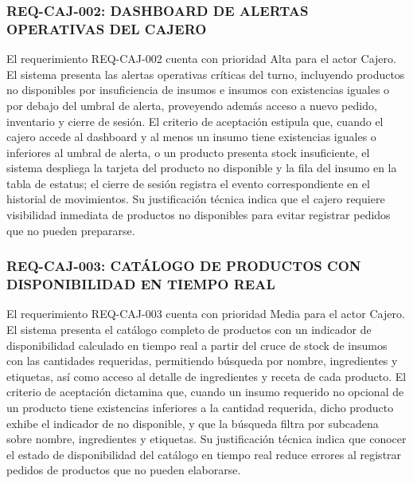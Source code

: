\subsubsection{REQ-CAJ-002: DASHBOARD DE ALERTAS OPERATIVAS DEL CAJERO}
El requerimiento REQ-CAJ-002 cuenta con prioridad Alta para el actor Cajero. El sistema presenta las alertas operativas críticas del turno, incluyendo productos no disponibles por insuficiencia de insumos e insumos con existencias iguales o por debajo del umbral de alerta, proveyendo además acceso a nuevo pedido, inventario y cierre de sesión. El criterio de aceptación estipula que, cuando el cajero accede al dashboard y al menos un insumo tiene existencias iguales o inferiores al umbral de alerta, o un producto presenta stock insuficiente, el sistema despliega la tarjeta del producto no disponible y la fila del insumo en la tabla de estatus; el cierre de sesión registra el evento correspondiente en el historial de movimientos. Su justificación técnica indica que el cajero requiere visibilidad inmediata de productos no disponibles para evitar registrar pedidos que no pueden prepararse.

\subsubsection{REQ-CAJ-003: CATÁLOGO DE PRODUCTOS CON DISPONIBILIDAD EN TIEMPO REAL}
El requerimiento REQ-CAJ-003 cuenta con prioridad Media para el actor Cajero. El sistema presenta el catálogo completo de productos con un indicador de disponibilidad calculado en tiempo real a partir del cruce de stock de insumos con las cantidades requeridas, permitiendo búsqueda por nombre, ingredientes y etiquetas, así como acceso al detalle de ingredientes y receta de cada producto. El criterio de aceptación dictamina que, cuando un insumo requerido no opcional de un producto tiene existencias inferiores a la cantidad requerida, dicho producto exhibe el indicador de no disponible, y que la búsqueda filtra por subcadena sobre nombre, ingredientes y etiquetas. Su justificación técnica indica que conocer el estado de disponibilidad del catálogo en tiempo real reduce errores al registrar pedidos de productos que no pueden elaborarse.


